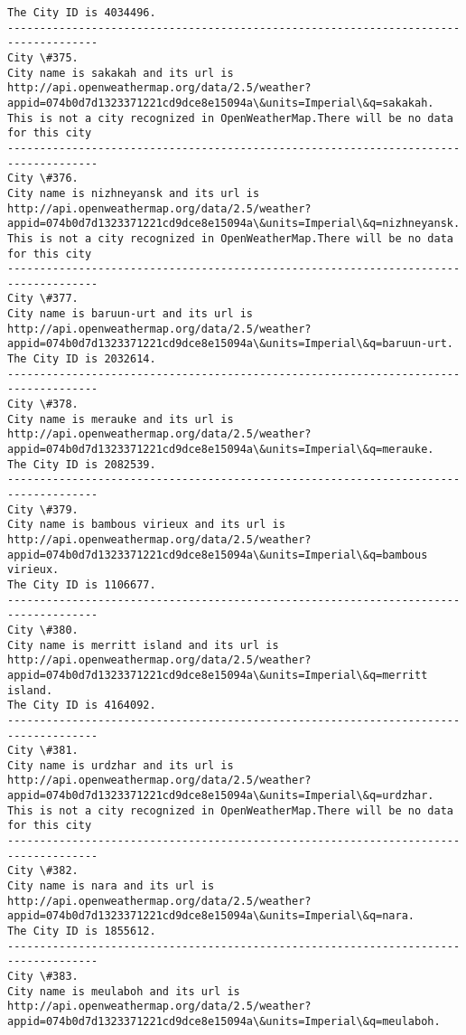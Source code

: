 \documentclass[11pt]{article}
\begin{document}
\begin{Verbatim}[commandchars=\\\{\}]
The City ID is 4034496.
------------------------------------------------------------------------------------
City \#375.
City name is sakakah and its url is http://api.openweathermap.org/data/2.5/weather?appid=074b0d7d1323371221cd9dce8e15094a\&units=Imperial\&q=sakakah.
This is not a city recognized in OpenWeatherMap.There will be no data for this city
------------------------------------------------------------------------------------
City \#376.
City name is nizhneyansk and its url is http://api.openweathermap.org/data/2.5/weather?appid=074b0d7d1323371221cd9dce8e15094a\&units=Imperial\&q=nizhneyansk.
This is not a city recognized in OpenWeatherMap.There will be no data for this city
------------------------------------------------------------------------------------
City \#377.
City name is baruun-urt and its url is http://api.openweathermap.org/data/2.5/weather?appid=074b0d7d1323371221cd9dce8e15094a\&units=Imperial\&q=baruun-urt.
The City ID is 2032614.
------------------------------------------------------------------------------------
City \#378.
City name is merauke and its url is http://api.openweathermap.org/data/2.5/weather?appid=074b0d7d1323371221cd9dce8e15094a\&units=Imperial\&q=merauke.
The City ID is 2082539.
------------------------------------------------------------------------------------
City \#379.
City name is bambous virieux and its url is http://api.openweathermap.org/data/2.5/weather?appid=074b0d7d1323371221cd9dce8e15094a\&units=Imperial\&q=bambous virieux.
The City ID is 1106677.
------------------------------------------------------------------------------------
City \#380.
City name is merritt island and its url is http://api.openweathermap.org/data/2.5/weather?appid=074b0d7d1323371221cd9dce8e15094a\&units=Imperial\&q=merritt island.
The City ID is 4164092.
------------------------------------------------------------------------------------
City \#381.
City name is urdzhar and its url is http://api.openweathermap.org/data/2.5/weather?appid=074b0d7d1323371221cd9dce8e15094a\&units=Imperial\&q=urdzhar.
This is not a city recognized in OpenWeatherMap.There will be no data for this city
------------------------------------------------------------------------------------
City \#382.
City name is nara and its url is http://api.openweathermap.org/data/2.5/weather?appid=074b0d7d1323371221cd9dce8e15094a\&units=Imperial\&q=nara.
The City ID is 1855612.
------------------------------------------------------------------------------------
City \#383.
City name is meulaboh and its url is http://api.openweathermap.org/data/2.5/weather?appid=074b0d7d1323371221cd9dce8e15094a\&units=Imperial\&q=meulaboh.

\end{Verbatim}
\end{document}
